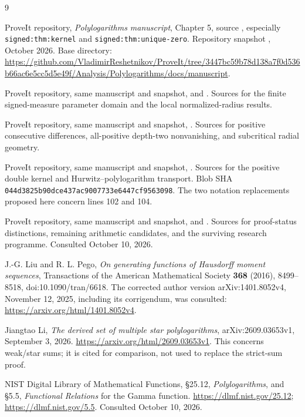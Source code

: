 \begin{thebibliography}{9}

ProveIt repository, \emph{Polylogarithms manuscript},
Chapter 5, source , especially
\texttt{signed:thm:kernel} and \texttt{signed:thm:unique-zero}.
Repository snapshot \texttt{\repoSHA}, October 2026.
Base directory:
\url{https://github.com/VladimirReshetnikov/ProveIt/tree/3447bc59b78d138a7f0d536b66ac6e5cc5d5e49f/Analysis/Polylogarithms/docs/manuscript}.

ProveIt repository, same manuscript and snapshot,
 and
. Sources for the finite
signed-measure parameter domain and the local normalized-radius results.

ProveIt repository, same manuscript and snapshot,
. Sources for positive
consecutive differences, all-positive depth-two nonvanishing, and
subcritical radial geometry.

ProveIt repository, same manuscript and snapshot,
. Sources for the positive
double kernel and Hurwitz--polylogarithm transport. Blob SHA
\texttt{044d3825b90dce437ac9007733e6447cf9563098}.
The two notation replacements proposed here concern lines 102 and 104.

ProveIt repository, same manuscript and snapshot,
 and . Sources for
proof-status distinctions, remaining arithmetic candidates, and the
surviving research programme. Consulted October 10, 2026.

J.-G. Liu and R. L. Pego, \emph{On generating functions of Hausdorff
moment sequences}, Transactions of the American Mathematical Society
\textbf{368} (2016), 8499--8518, doi:10.1090/tran/6618.
The corrected author version arXiv:1401.8052v4, November 12, 2025,
including its corrigendum, was consulted:
\url{https://arxiv.org/html/1401.8052v4}.

Jiangtao Li, \emph{The derived set of multiple star polylogarithms},
arXiv:2609.03653v1, September 3, 2026.
\url{https://arxiv.org/html/2609.03653v1}.
This concerns weak/star sums; it is cited for comparison, not used to
replace the strict-sum proof.

NIST Digital Library of Mathematical Functions,
\S25.12, \emph{Polylogarithms}, and \S5.5, \emph{Functional Relations}
for the Gamma function.
\url{https://dlmf.nist.gov/25.12};
\url{https://dlmf.nist.gov/5.5}.
Consulted October 10, 2026.
\end{thebibliography}
